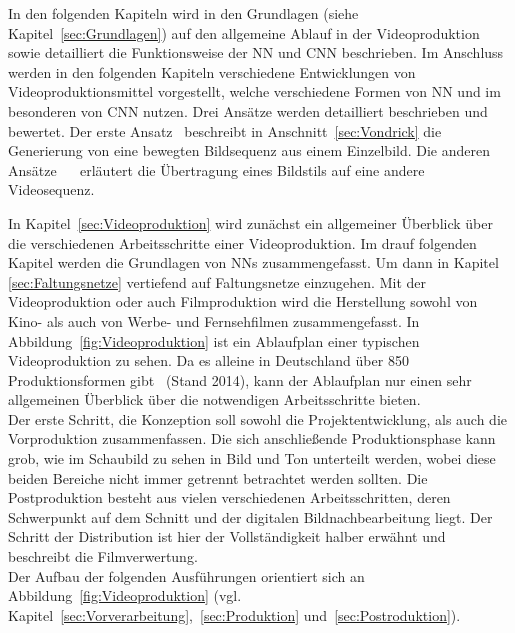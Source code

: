 \documentclass[times, 12pt,twocolumn]{article}
\begin{document}
In den folgenden Kapiteln wird in den Grundlagen (siehe Kapitel~\ref{sec:Grundlagen}) auf den allgemeine Ablauf in der Videoproduktion sowie detailliert die Funktionsweise der NN und CNN beschrieben. Im Anschluss werden in den folgenden Kapiteln verschiedene Entwicklungen von Videoproduktionsmittel vorgestellt, welche verschiedene Formen von NN und im besonderen von CNN nutzen. Drei Ansätze werden detailliert beschrieben und bewertet. Der erste Ansatz~\cite{VondrickPT16} beschreibt in Anschnitt~\ref{sec:Vondrick} die Generierung von eine bewegten Bildsequenz aus einem Einzelbild. Die anderen Ansätze~ \cite{DeepDream}~\cite{GatysEB15a} erläutert die Übertragung eines Bildstils auf eine andere Videosequenz.


 \label{sec:Grundlagen}
In Kapitel~\ref{sec:Videoproduktion} wird zunächst ein allgemeiner Überblick über die verschiedenen Arbeitsschritte einer Videoproduktion. Im drauf folgenden Kapitel werden die Grundlagen von NNs zusammengefasst. Um dann in Kapitel \ref{sec:Faltungsnetze} vertiefend auf Faltungsnetze einzugehen. 
 \label{sec:Videoproduktion}
Mit der Videoproduktion oder auch Filmproduktion wird die Herstellung sowohl von Kino- als auch von Werbe- und Fernsehfilmen zusammengefasst. In Abbildung~\ref{fig:Videoproduktion} ist ein Ablaufplan einer typischen Videoproduktion zu sehen. Da es alleine in Deutschland über 850 Produktionsformen gibt~\cite{formatt} (Stand 2014), kann der Ablaufplan nur einen sehr allgemeinen Überblick über die notwendigen Arbeitsschritte bieten. \\
Der erste Schritt, die Konzeption soll sowohl die Projektentwicklung, als auch die Vorproduktion zusammenfassen. Die sich anschließende Produktionsphase kann grob, wie im Schaubild zu sehen in Bild und Ton unterteilt werden, wobei diese beiden Bereiche nicht immer getrennt betrachtet werden sollten. Die Postproduktion besteht aus vielen verschiedenen Arbeitsschritten, deren Schwerpunkt auf dem Schnitt und der digitalen Bildnachbearbeitung liegt. Der Schritt der Distribution ist hier der Vollständigkeit halber erwähnt und beschreibt die Filmverwertung. \\

Der Aufbau der folgenden Ausführungen orientiert sich an Abbildung~\ref{fig:Videoproduktion} (vgl. Kapitel~\ref{sec:Vorverarbeitung},~\ref{sec:Produktion} und~\ref{sec:Postroduktion}).
\end{document}
